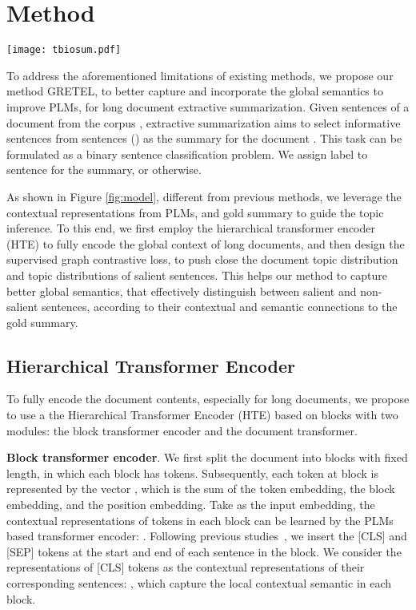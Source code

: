 \documentclass[11pt]{article}
\begin{document}
\section{Method}
\begin{figure*}
  \centering
      \texttt{[image: tbiosum.pdf]}
\caption{The model architecture of GRETEL}
\label{fig:model}
\end{figure*}
To address the aforementioned limitations of existing methods, we propose our method GRETEL, to better capture and incorporate the global semantics to improve PLMs, for long document extractive summarization.
Given  sentences  of a document  from the corpus , extractive summarization aims to select  informative sentences from  sentences () as the summary  for the document . 
This task can be formulated as a binary sentence classification problem. 
We assign label  to sentence  for the summary, or  otherwise.

As shown in Figure \ref{fig:model}, different from previous methods, we leverage the contextual representations from PLMs, and gold summary to guide the topic inference.
To this end, we first employ the hierarchical transformer encoder (HTE) to fully encode the global context of long documents, and then design the supervised graph contrastive loss, to push close the document topic distribution and topic distributions of salient sentences.
This helps our method to capture better global semantics, that effectively distinguish between salient and non-salient sentences, according to their contextual and semantic connections to the gold summary.


\subsection{Hierarchical Transformer Encoder}
To fully encode the document contents, especially for long documents, we propose to use a the Hierarchical Transformer Encoder (HTE) based on blocks with two modules: the block transformer encoder and the document transformer.


\textbf{Block transformer encoder}. We first split the document  into  blocks with fixed length, in which each block  has  tokens.
Subsequently, each token  at block  is represented by the vector , which is the sum of the token embedding, the block embedding, and the position embedding.
Take  as the input embedding, the contextual representations of tokens in each block  can be learned by the PLMs based transformer encoder: .
Following previous studies~\cite{liu2019text}, we insert the [CLS] and [SEP] tokens at the start and end of each sentence in the block.
We consider the representations of [CLS] tokens as the contextual representations of their corresponding sentences: , which capture the local contextual semantic in each block. 
\end{document}
